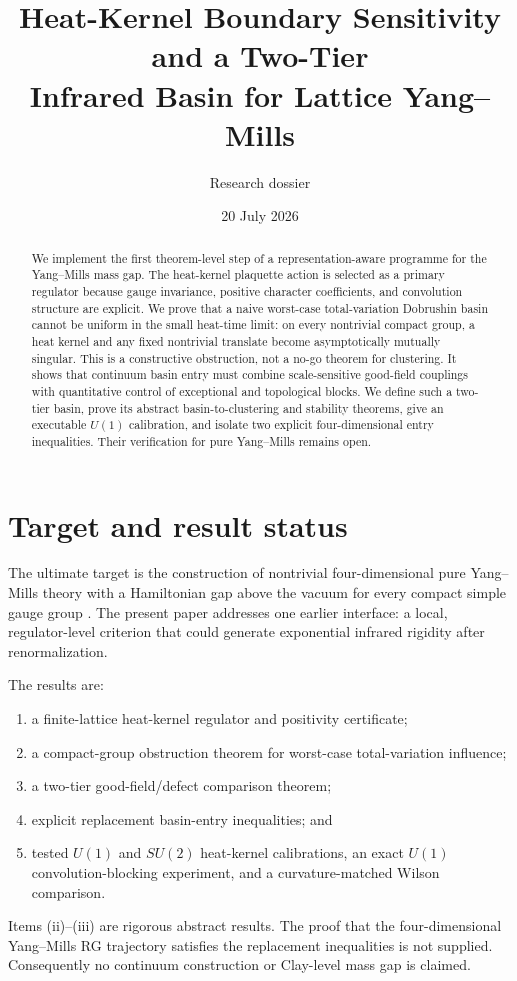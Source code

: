 \documentclass[11pt]{article}
\title{Heat-Kernel Boundary Sensitivity and a Two-Tier\\
Infrared Basin for Lattice Yang--Mills}
\author{Research dossier}
\date{20 July 2026}
\theoremstyle{remark}
\begin{document}
\maketitle

\begin{abstract}
We implement the first theorem-level step of a representation-aware programme
for the Yang--Mills mass gap.  The heat-kernel plaquette action is selected as
a primary regulator because gauge invariance, positive character coefficients,
and convolution structure are explicit.  We prove that a naive worst-case
total-variation Dobrushin basin cannot be uniform in the small heat-time limit:
on every nontrivial compact group, a heat kernel and any fixed nontrivial
translate become asymptotically mutually singular.  This is a constructive
obstruction, not a no-go theorem for clustering.  It shows that continuum basin
entry must combine scale-sensitive good-field couplings with quantitative
control of exceptional and topological blocks.  We define such a two-tier
basin, prove its abstract basin-to-clustering and stability theorems, give an
executable $U(1)$ calibration, and isolate two explicit four-dimensional entry
inequalities.  Their verification for pure Yang--Mills remains open.
\end{abstract}

\tableofcontents

\section{Target and result status}

The ultimate target is the construction of nontrivial four-dimensional pure
Yang--Mills theory with a Hamiltonian gap above the vacuum for every compact
simple gauge group \cite{JaffeWitten}.  The present paper addresses one earlier
interface: a local, regulator-level criterion that could generate exponential
infrared rigidity after renormalization.

The results are:
\begin{enumerate}[label=(\roman*)]
\item a finite-lattice heat-kernel regulator and positivity certificate;
\item a compact-group obstruction theorem for worst-case total-variation
      influence;
\item a two-tier good-field/defect comparison theorem;
\item explicit replacement basin-entry inequalities; and
\item tested $U(1)$ and $SU(2)$ heat-kernel calibrations, an exact $U(1)$
      convolution-blocking experiment, and a curvature-matched Wilson
      comparison.
\end{enumerate}
Items (ii)--(iii) are rigorous abstract results.  The proof that the
four-dimensional Yang--Mills RG trajectory satisfies the replacement
inequalities is not supplied.  Consequently no continuum construction or
Clay-level mass gap is claimed.
\end{document}
